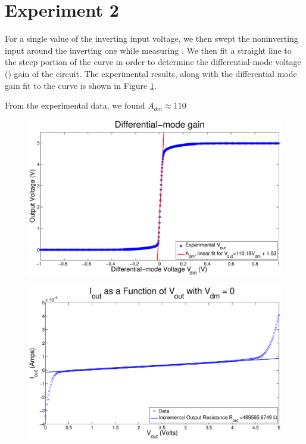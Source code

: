 \section*{Experiment 2}

For a single value of the inverting input voltage, we then swept the noninverting input around the inverting one while measuring \Vout. We then fit a straight line to the steep portion of the curve in order to determine the differential-mode voltage (\Adm) gain of the circuit. The experimental results, along with the differential mode gain fit to the curve is shown in Figure \ref{fig:exp2p1}.

From the experimental data, we found $A_{dm} \approx 110$


\begin{figure}[H]
\centering
\includegraphics[width=\linewidth]{../Figures/Exp2P1.eps}
\caption{}
\label{fig:exp2p1}
\end{figure}

\begin{figure}[H]
\centering
\includegraphics[width=\linewidth]{../Figures/Exp2P2.eps}
\caption{}
\label{fig:exp2p2}
\end{figure}

